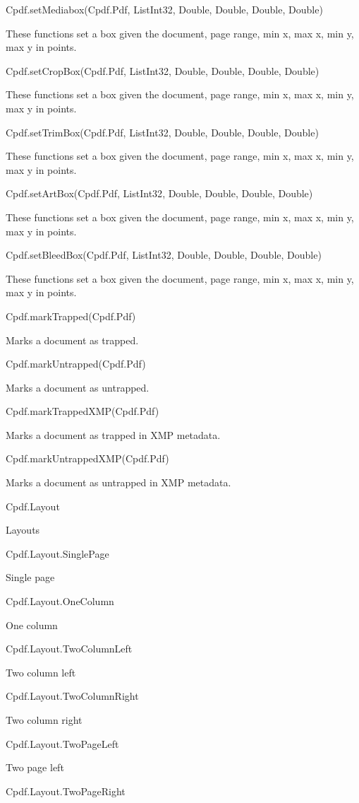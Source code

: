 Cpdf.setMediabox(Cpdf.Pdf, List{Int32}, Double, Double, Double, Double)


These functions set a box given the document, page range, min x, max x, 
min y, max y in points.


Cpdf.setCropBox(Cpdf.Pdf, List{Int32}, Double, Double, Double, Double)


These functions set a box given the document, page range, min x, max x, 
min y, max y in points.


Cpdf.setTrimBox(Cpdf.Pdf, List{Int32}, Double, Double, Double, Double)


These functions set a box given the document, page range, min x, max x, 
min y, max y in points.


Cpdf.setArtBox(Cpdf.Pdf, List{Int32}, Double, Double, Double, Double)


These functions set a box given the document, page range, min x, max x, 
min y, max y in points.


Cpdf.setBleedBox(Cpdf.Pdf, List{Int32}, Double, Double, Double, Double)


These functions set a box given the document, page range, min x, max x, 
min y, max y in points.


Cpdf.markTrapped(Cpdf.Pdf)


Marks a document as trapped.


Cpdf.markUntrapped(Cpdf.Pdf)


Marks a document as untrapped.


Cpdf.markTrappedXMP(Cpdf.Pdf)


Marks a document as trapped in XMP metadata.


Cpdf.markUntrappedXMP(Cpdf.Pdf)


Marks a document as untrapped in XMP metadata.


Cpdf.Layout

Layouts

Cpdf.Layout.SinglePage

Single page

Cpdf.Layout.OneColumn

One column

Cpdf.Layout.TwoColumnLeft

Two column left

Cpdf.Layout.TwoColumnRight

Two column right

Cpdf.Layout.TwoPageLeft

Two page left

Cpdf.Layout.TwoPageRight

